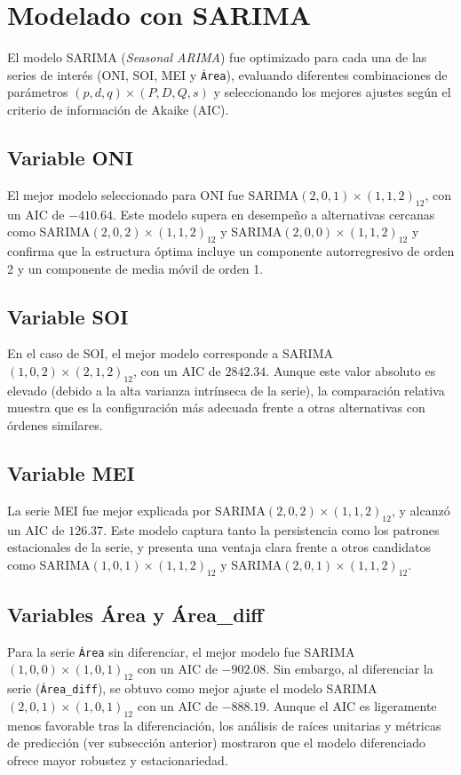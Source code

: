 \section{Modelado con SARIMA}

El modelo SARIMA (\textit{Seasonal ARIMA}) fue optimizado para cada una de las series de interés (ONI, SOI, MEI y \texttt{Área}), evaluando diferentes combinaciones de parámetros $(p,d,q)\times(P,D,Q,s)$ y seleccionando los mejores ajustes según el criterio de información de Akaike (AIC). 

\subsection{Variable ONI}
El mejor modelo seleccionado para ONI fue SARIMA$(2,0,1)\times(1,1,2)_{12}$, con un AIC de $-410.64$. Este modelo supera en desempeño a alternativas cercanas como SARIMA$(2,0,2)\times(1,1,2)_{12}$ y SARIMA$(2,0,0)\times(1,1,2)_{12}$ y confirma que la estructura óptima incluye un componente autorregresivo de orden 2 y un componente de media móvil de orden 1.

\subsection{Variable SOI}
En el caso de SOI, el mejor modelo corresponde a SARIMA$(1,0,2)\times(2,1,2)_{12}$, con un AIC de $2842.34$. Aunque este valor absoluto es elevado (debido a la alta varianza intrínseca de la serie), la comparación relativa muestra que es la configuración más adecuada frente a otras alternativas con órdenes similares.

\subsection{Variable MEI}
La serie MEI fue mejor explicada por SARIMA$(2,0,2)\times(1,1,2)_{12}$, y alcanzó un AIC de $126.37$. Este modelo captura tanto la persistencia como los patrones estacionales de la serie, y presenta una ventaja clara frente a otros candidatos como SARIMA$(1,0,1)\times(1,1,2)_{12}$ y SARIMA$(2,0,1)\times(1,1,2)_{12}$.

\subsection{Variables Área y Área\_diff}
Para la serie \texttt{Área} sin diferenciar, el mejor modelo fue SARIMA$(1,0,0)\times(1,0,1)_{12}$ con un AIC de $-902.08$. Sin embargo, al diferenciar la serie (\texttt{Área\_diff}), se obtuvo como mejor ajuste el modelo SARIMA$(2,0,1)\times(1,0,1)_{12}$ con un AIC de $-888.19$. Aunque el AIC es ligeramente menos favorable tras la diferenciación, los análisis de raíces unitarias y métricas de predicción (ver subsección anterior) mostraron que el modelo diferenciado ofrece mayor robustez y estacionariedad.

